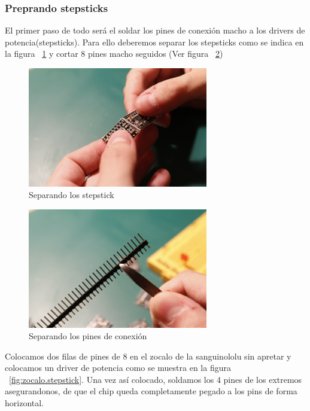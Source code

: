 		\subsubsection{Preprando stepsticks}
		El primer paso de todo será el soldar los pines de conexión macho a los drivers de potencia(stepsticks). Para ello deberemos separar los stepsticks como se indica en la figura ~\ref{fig:cortar.stepstick} y cortar 8 pines macho seguidos (Ver figura ~\ref{fig:cortar.pines})\\
				\begin{figure}[H]
				\centering
				\includegraphics[width=0.7\textwidth]{../../Fotos/10.jpg}
				\caption{Separando los stepstick}
				\label{fig:cortar.stepstick}
			\end {figure}
				\begin{figure}[H]
				\centering
				\includegraphics[width=0.7\textwidth]{../../Fotos/11.jpg}
				\caption{Separando los pines de conexión}
				\label{fig:cortar.pines}
			\end {figure}
			Colocamos dos filas de pines de 8 en el zocalo de la sanguinololu sin apretar y colocamos un driver de potencia como se muestra en la figura ~\ref{fig:zocalo.stepstick}. Una vez así colocado, soldamos los 4 pines de los extremos asegurandonos, de que el chip queda completamente pegado a los pins de forma horizontal. 
